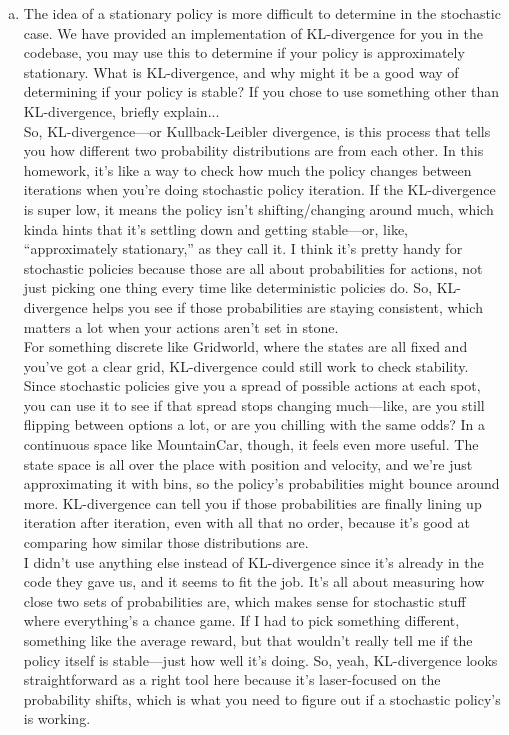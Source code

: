 \documentclass{article}
\newenvironment{answer}{{\bf Answer:} \sf }{}%
\begin{document}
\begin{enumerate}[a)]
      \\  
    \item The idea of a stationary policy is more difficult to determine in the stochastic case. We have
    provided an implementation of KL-divergence for you in the codebase, you may use this to
    determine if your policy is approximately stationary. What is KL-divergence, and why might
    it be a good way of determining if your policy is stable? If you chose to use something other
    than KL-divergence, briefly explain...
    \\ \begin{answer}
      So, KL-divergence—or Kullback-Leibler divergence, is this process that tells you how different two probability distributions are from each other. In this homework, it’s like a way to check how much the policy changes between iterations when you’re doing stochastic policy iteration. If the KL-divergence is super low, it means the policy isn’t shifting/changing around much, which kinda hints that it’s settling down and getting stable—or, like, “approximately stationary,” as they call it. I think it’s pretty handy for stochastic policies because those are all about probabilities for actions, not just picking one thing every time like deterministic policies do. So, KL-divergence helps you see if those probabilities are staying consistent, which matters a lot when your actions aren’t set in stone.
      \\
      For something discrete like Gridworld, where the states are all fixed and you’ve got a clear grid, KL-divergence could still work to check stability. Since stochastic policies give you a spread of possible actions at each spot, you can use it to see if that spread stops changing much—like, are you still flipping between options a lot, or are you chilling with the same odds? In a continuous space like MountainCar, though, it feels even more useful. The state space is all over the place with position and velocity, and we’re just approximating it with bins, so the policy’s probabilities might bounce around more. KL-divergence can tell you if those probabilities are finally lining up iteration after iteration, even with all that no order, because it’s good at comparing how similar those distributions are.
      \\
      I didn’t use anything else instead of KL-divergence since it’s already in the code they gave us, and it seems to fit the job. It’s all about measuring how close two sets of probabilities are, which makes sense for stochastic stuff where everything’s a chance game. If I had to pick something different, something like the average reward, but that wouldn’t really tell me if the policy itself is stable—just how well it’s doing. So, yeah, KL-divergence looks straightforward as a right tool here because it’s laser-focused on the probability shifts, which is what you need to figure out if a stochastic policy’s is working.

\end{answer}
\end{enumerate}
\end{document}
